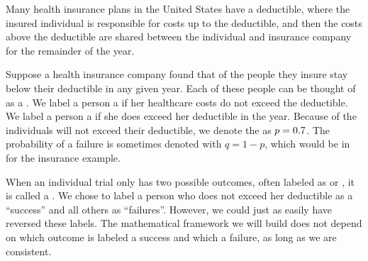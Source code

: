 

Many health insurance plans in the United States have
a deductible, where the insured individual is responsible
for costs up to the deductible, and then the costs above
the deductible are shared between the individual and
insurance company for the remainder of the year.

Suppose a health insurance company found that \insureSperc{} of the
people they insure stay below their deductible in any given year.
Each of these people can be thought of as a .
We label a person a  if her healthcare costs
do not exceed the deductible.
We label a person a  if she does exceed her
deductible in the year.
Because \insureSperc{} of the individuals will not exceed their deductible,
we denote the  as
$p = 0.7{}$.
The probability of a failure is sometimes denoted with
$q = 1 - p$, which would be \insureFprob{} in for the insurance
example.

When an individual trial only has two possible outcomes, often
labeled as  or , it is called a
.
We chose to label a person who does not exceed her deductible
as a ``success'' and all others as ``failures''.
However, we could just as easily have reversed these labels.
The mathematical framework we will build does not depend
on which outcome is labeled a success and which a failure,
as long as we are consistent.



